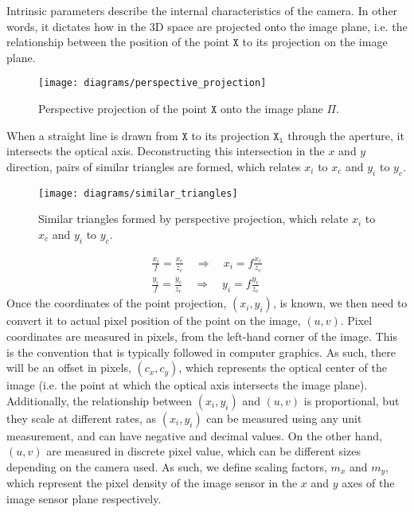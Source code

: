 Intrinsic parameters describe the internal characteristics of the camera. In other words, it dictates how in the 3D space are projected onto the image plane, i.e. the relationship between the position of the point $\mathtt{X}$ to its projection on the image plane.

\begin{figure}[H]
    \centering
    \texttt{[image: diagrams/perspective\_projection]}
    \caption{Perspective projection of the point $\mathtt{X}$ onto the image plane $\Pi$.}
\end{figure}
When a straight line is drawn from $\mathtt{X}$ to its projection $\mathtt{X_i}$ through the aperture, it intersects the optical axis. Deconstructing this intersection in the $x$ and $y$ direction, pairs of similar triangles are formed, which relates $x_i$ to $x_c$ and $y_i$ to $y_c$.
\begin{figure}[H]
    \centering
    \texttt{[image: diagrams/similar\_triangles]}
    \caption{Similar triangles formed by perspective projection, which relate $x_i$ to $x_c$ and $y_i$ to $y_c$.} \label{fig:similar_triangles}
\end{figure}
\begin{subequations}
    \begin{gather}
        \frac{x_i}{f} = \frac{x_c}{z_c} \quad \Longrightarrow \quad x_i = f \frac{x_c}{z_c} \label{subeq:xi_result}\\
        \frac{y_i}{f} = \frac{y_c}{z_c} \quad \Longrightarrow \quad y_i = f \frac{y_c}{z_c} \label{subeq:yi_result}
    \end{gather}
\end{subequations}
Once the coordinates of the point projection, $(x_i, y_i)$, is known, we then need to convert it to actual pixel position of the point on the image, $(u, v)$. Pixel coordinates are measured in pixels, from the left-hand corner of the image. This is the convention that is typically followed in computer graphics. As such, there will be an offset in pixels, $(c_x, c_y)$, which represents the optical center of the image (i.e. the point at which the optical axis intersects the image plane). Additionally, the relationship between $(x_i, y_i)$ and $(u, v)$ is proportional, but they scale at different rates, as $(x_i, y_i)$ can be measured using any unit measurement, and can have negative and decimal values. On the other hand, $(u,v)$ are measured in discrete pixel value, which can be different sizes depending on the camera used. As such, we define scaling factors, $m_x$ and $m_y$, which represent the pixel density of the image sensor in the $x$ and $y$ axes of the image sensor plane respectively.
